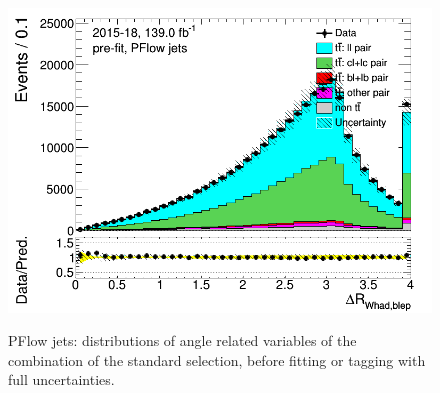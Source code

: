 \documentclass[letterpaper,12pt]{article}
\begin{document}
\begin{figure}[H]
\includegraphics[width=.45\textwidth]{FTAG_plots/pretagNoRwwithouthighpTPFlowall/DataMC_h_dRWhadblep.png} \\
\caption{PFlow jets: distributions of angle related variables of the combination of the standard selection,
 before fitting or 
tagging with full uncertainties.} \label{fig:standard_angles_PFlow}
\end{figure}
\end{document}
